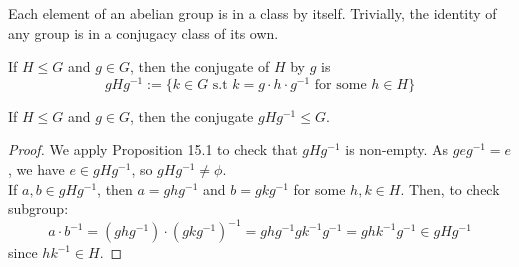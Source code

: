 \documentclass[a4paper]{article}
\begin{document}
\begin{cor}
Each element of an abelian group is in a class by itself. Trivially, the identity of any group is in a conjugacy class of its own.
\end{cor}
\begin{defi}[Conjugate of $H$ by $g$]
If $H\leq G$ and $g\in G$, then the conjugate of $H$ by $g$ is
$$gHg^{-1}:=\{k\in G\text{ s.t }k=g\cdot h\cdot g^{-1}\text{  for some }h\in H\}$$
\end{defi}
\begin{lemma}
If $H\leq G$ and $g\in G$, then the conjugate $gHg^{-1}\leq G$.
\end{lemma}
\begin{proof}
We apply Proposition 15.1 to check that $gHg^{-1}$ is non-empty. As $geg^{-1}=e$, we have $e\in gHg^{-1}$, so $gHg^{-1}\neq\phi$.\\[5pt]
If $a,b\in gHg^{-1}$, then $a=ghg^{-1}$ and $b=gkg^{-1}$ for some $h,k\in H$. Then, to check subgroup:
$$a\cdot b^{-1}=(ghg^{-1})\cdot(gkg^{-1})^{-1}=ghg^{-1}gk^{-1}g^{-1}=ghk^{-1}g^{-1}\in gHg^{-1}$$
since $hk^{-1}\in H$.
\end{proof}
\newpage
\end{document}
